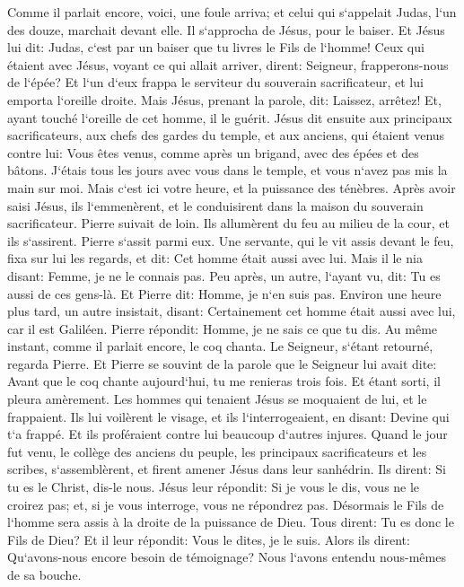 \verse Comme il parlait encore, voici, une foule arriva; et celui qui s`appelait Judas, l`un des douze, marchait devant elle. Il s`approcha de Jésus, pour le baiser. 
\verse Et Jésus lui dit: Judas, c`est par un baiser que tu livres le Fils de l`homme! 
\verse Ceux qui étaient avec Jésus, voyant ce qui allait arriver, dirent: Seigneur, frapperons-nous de l`épée? 
\verse Et l`un d`eux frappa le serviteur du souverain sacrificateur, et lui emporta l`oreille droite. 
\verse Mais Jésus, prenant la parole, dit: Laissez, arrêtez! Et, ayant touché l`oreille de cet homme, il le guérit. 
\verse Jésus dit ensuite aux principaux sacrificateurs, aux chefs des gardes du temple, et aux anciens, qui étaient venus contre lui: Vous êtes venus, comme après un brigand, avec des épées et des bâtons. 
\verse J`étais tous les jours avec vous dans le temple, et vous n`avez pas mis la main sur moi. Mais c`est ici votre heure, et la puissance des ténèbres. 
\verse Après avoir saisi Jésus, ils l`emmenèrent, et le conduisirent dans la maison du souverain sacrificateur. Pierre suivait de loin. 
\verse Ils allumèrent du feu au milieu de la cour, et ils s`assirent. Pierre s`assit parmi eux. 
\verse Une servante, qui le vit assis devant le feu, fixa sur lui les regards, et dit: Cet homme était aussi avec lui. 
\verse Mais il le nia disant: Femme, je ne le connais pas. 
\verse Peu après, un autre, l`ayant vu, dit: Tu es aussi de ces gens-là. Et Pierre dit: Homme, je n`en suis pas. 
\verse Environ une heure plus tard, un autre insistait, disant: Certainement cet homme était aussi avec lui, car il est Galiléen. 
\verse Pierre répondit: Homme, je ne sais ce que tu dis. Au même instant, comme il parlait encore, le coq chanta. 
\verse Le Seigneur, s`étant retourné, regarda Pierre. Et Pierre se souvint de la parole que le Seigneur lui avait dite: Avant que le coq chante aujourd`hui, tu me renieras trois fois. 
\verse Et étant sorti, il pleura amèrement. 
\verse Les hommes qui tenaient Jésus se moquaient de lui, et le frappaient. 
\verse Ils lui voilèrent le visage, et ils l`interrogeaient, en disant: Devine qui t`a frappé. 
\verse Et ils proféraient contre lui beaucoup d`autres injures. 
\verse Quand le jour fut venu, le collège des anciens du peuple, les principaux sacrificateurs et les scribes, s`assemblèrent, et firent amener Jésus dans leur sanhédrin. 
\verse Ils dirent: Si tu es le Christ, dis-le nous. Jésus leur répondit: Si je vous le dis, vous ne le croirez pas; 
\verse et, si je vous interroge, vous ne répondrez pas. 
\verse Désormais le Fils de l`homme sera assis à la droite de la puissance de Dieu. 
\verse Tous dirent: Tu es donc le Fils de Dieu? Et il leur répondit: Vous le dites, je le suis. 
\verse Alors ils dirent: Qu`avons-nous encore besoin de témoignage? Nous l`avons entendu nous-mêmes de sa bouche. 

